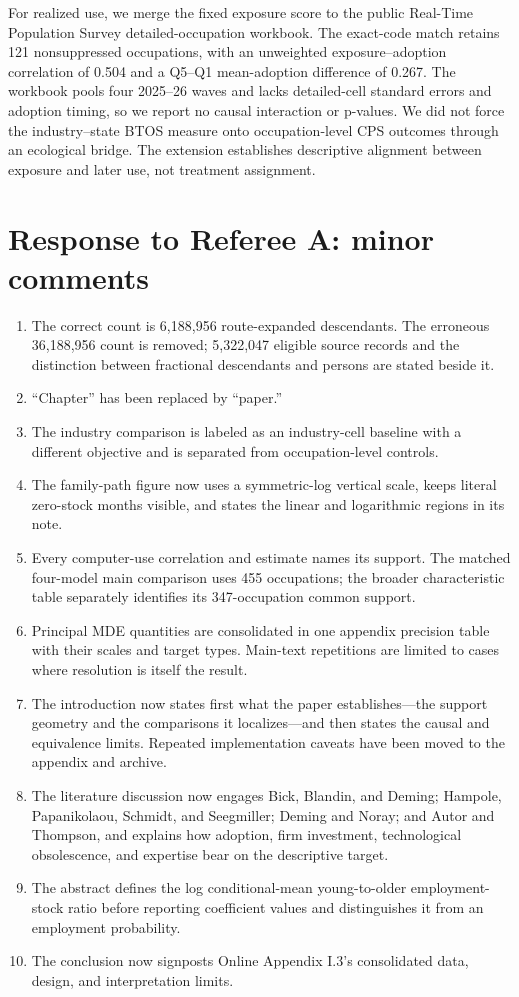 \documentclass[11pt,letterpaper]{article}
\begin{document}
For realized use, we merge the fixed exposure score to the public Real-Time Population Survey detailed-occupation workbook.  The exact-code match retains 121 nonsuppressed occupations, with an unweighted exposure--adoption correlation of 0.504 and a Q5--Q1 mean-adoption difference of 0.267.  The workbook pools four 2025--26 waves and lacks detailed-cell standard errors and adoption timing, so we report no causal interaction or p-values.  We did not force the industry--state BTOS measure onto occupation-level CPS outcomes through an ecological bridge.  The extension establishes descriptive alignment between exposure and later use, not treatment assignment.

\section*{Response to Referee A: minor comments}

\begin{enumerate}[leftmargin=1.8em]
\item The correct count is 6,188,956 route-expanded descendants.  The erroneous 36,188,956 count is removed; 5,322,047 eligible source records and the distinction between fractional descendants and persons are stated beside it.
\item ``Chapter'' has been replaced by ``paper.''
\item The industry comparison is labeled as an industry-cell baseline with a different objective and is separated from occupation-level controls.
\item The family-path figure now uses a symmetric-log vertical scale, keeps literal zero-stock months visible, and states the linear and logarithmic regions in its note.
\item Every computer-use correlation and estimate names its support.  The matched four-model main comparison uses 455 occupations; the broader characteristic table separately identifies its 347-occupation common support.
\item Principal MDE quantities are consolidated in one appendix precision table with their scales and target types.  Main-text repetitions are limited to cases where resolution is itself the result.
\item The introduction now states first what the paper establishes---the support geometry and the comparisons it localizes---and then states the causal and equivalence limits.  Repeated implementation caveats have been moved to the appendix and archive.
\item The literature discussion now engages Bick, Blandin, and Deming; Hampole, Papanikolaou, Schmidt, and Seegmiller; Deming and Noray; and Autor and Thompson, and explains how adoption, firm investment, technological obsolescence, and expertise bear on the descriptive target.
\item The abstract defines the log conditional-mean young-to-older employment-stock ratio before reporting coefficient values and distinguishes it from an employment probability.
\item The conclusion now signposts Online Appendix I.3's consolidated data, design, and interpretation limits.
\end{enumerate}
\end{document}
